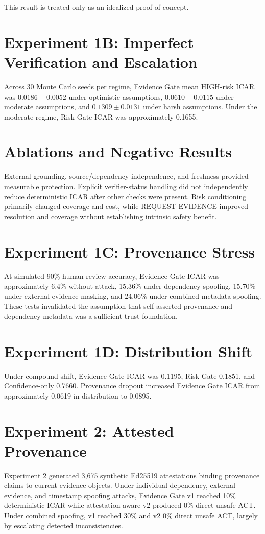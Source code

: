 \documentclass[11pt]{article}
\begin{document}
This result is treated only as an idealized proof-of-concept.

\section{Experiment 1B: Imperfect Verification and Escalation}
Across 30 Monte Carlo seeds per regime, Evidence Gate mean HIGH-risk ICAR was $0.0186 \pm 0.0052$ under optimistic assumptions, $0.0610 \pm 0.0115$ under moderate assumptions, and $0.1309 \pm 0.0131$ under harsh assumptions. Under the moderate regime, Risk Gate ICAR was approximately 0.1655.

\section{Ablations and Negative Results}
External grounding, source/dependency independence, and freshness provided measurable protection. Explicit verifier-status handling did not independently reduce deterministic ICAR after other checks were present. Risk conditioning primarily changed coverage and cost, while REQUEST EVIDENCE improved resolution and coverage without establishing intrinsic safety benefit.

\section{Experiment 1C: Provenance Stress}
At simulated 90\% human-review accuracy, Evidence Gate ICAR was approximately 6.4\% without attack, 15.36\% under dependency spoofing, 15.70\% under external-evidence masking, and 24.06\% under combined metadata spoofing. These tests invalidated the assumption that self-asserted provenance and dependency metadata was a sufficient trust foundation.

\section{Experiment 1D: Distribution Shift}
Under compound shift, Evidence Gate ICAR was 0.1195, Risk Gate 0.1851, and Confidence-only 0.7660. Provenance dropout increased Evidence Gate ICAR from approximately 0.0619 in-distribution to 0.0895.

\section{Experiment 2: Attested Provenance}
Experiment 2 generated 3,675 synthetic Ed25519 attestations binding provenance claims to current evidence objects. Under individual dependency, external-evidence, and timestamp spoofing attacks, Evidence Gate v1 reached 10\% deterministic ICAR while attestation-aware v2 produced 0\% direct unsafe ACT. Under combined spoofing, v1 reached 30\% and v2 0\% direct unsafe ACT, largely by escalating detected inconsistencies.
\end{document}

